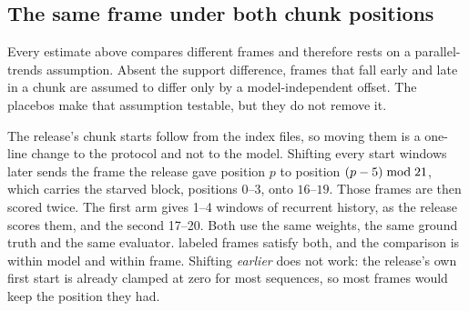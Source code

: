 \documentclass[10pt,twocolumn,letterpaper]{article}
\begin{document}
\subsection{The same frame under both chunk positions}
\label{sup:paired}

Every estimate above compares different frames and therefore rests on a parallel-trends
assumption. Absent the support difference, frames that fall early and late in a chunk are
assumed to differ only by a model-independent offset. The placebos make that
assumption testable, but they do not remove it.

The release's chunk starts follow from the index files, so moving them is a one-line change
to the protocol and not to the model. Shifting every start \ssmPairedShift{} windows later
sends the frame the release gave position $p$ to position $(p-5)\bmod
21{}$, which carries the starved block, positions $0$--$3$, onto $16$--$19$.
Those frames are then scored twice. The first arm gives 1--4 windows of recurrent
history, as the release scores them, and the second 17--20. Both use the same
weights, the same ground truth and the same evaluator. \ssmPairedN{} labeled frames satisfy both, and the
comparison is within model and within frame. Shifting \emph{earlier} does not work: the
release's own first start is already clamped at zero for most sequences, so most frames
would keep the position they had.
\end{document}

